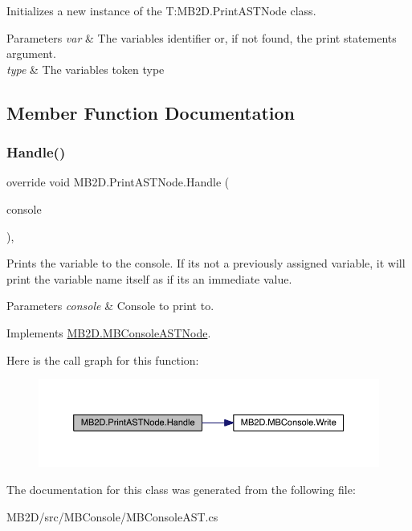 Initializes a new instance of the T\+:\+M\+B2\+D.\+Print\+A\+S\+T\+Node class. 


\begin{DoxyParams}{Parameters}
{\em var} & The variables identifier or, if not found, the print statements argument. \\
\hline
{\em type} & The variables token type\\
\hline
\end{DoxyParams}


\subsection{Member Function Documentation}
\hypertarget{class_m_b2_d_1_1_print_a_s_t_node_a61d2408e999df07c1190f6ba8bb6ad3f}{}\label{class_m_b2_d_1_1_print_a_s_t_node_a61d2408e999df07c1190f6ba8bb6ad3f} 
\subsubsection{\texorpdfstring{Handle()}{Handle()}}
{\footnotesize\ttfamily override void M\+B2\+D.\+Print\+A\+S\+T\+Node.\+Handle (\begin{DoxyParamCaption}\item[{\hyperlink{class_m_b2_d_1_1_m_b_console}{M\+B\+Console}}]{console }\end{DoxyParamCaption})\hspace{0.3cm}{\ttfamily [inline]}, {\ttfamily [virtual]}}



Prints the variable to the console. If it\textquotesingle{}s not a previously assigned variable, it will print the variable name itself as if it\textquotesingle{}s an immediate value. 


\begin{DoxyParams}{Parameters}
{\em console} & Console to print to.\\
\hline
\end{DoxyParams}


Implements \hyperlink{class_m_b2_d_1_1_m_b_console_a_s_t_node_aa70a49e61ab623698af4ed8fda4ebbf5}{M\+B2\+D.\+M\+B\+Console\+A\+S\+T\+Node}.

Here is the call graph for this function\+:
\nopagebreak
\begin{figure}[H]
\begin{center}
\leavevmode
\includegraphics[width=350pt]{class_m_b2_d_1_1_print_a_s_t_node_a61d2408e999df07c1190f6ba8bb6ad3f_cgraph}
\end{center}
\end{figure}


The documentation for this class was generated from the following file\+:\begin{DoxyCompactItemize}
\item 
M\+B2\+D/src/\+M\+B\+Console/M\+B\+Console\+A\+S\+T.\+cs\end{DoxyCompactItemize}

